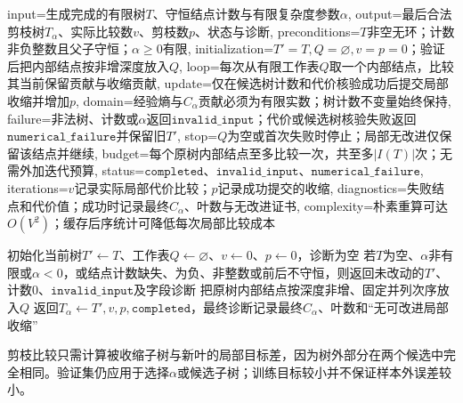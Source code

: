 \begin{AlgorithmContract}{
  input={生成完成的有限树$T$、守恒结点计数与有限复杂度参数$\alpha$},
  output={最后合法剪枝树$T_\alpha$、实际比较数$v$、剪枝数$p$、状态与诊断},
  preconditions={$T$非空无环；计数非负整数且父子守恒；$\alpha\ge0$有限},
  initialization={$T'=T,Q=\varnothing,v=p=0$；验证后把内部结点按非增深度放入$Q$},
  loop={每次从有限工作表$Q$取一个内部结点，比较其当前保留贡献与收缩贡献},
  update={仅在候选树计数和代价核验成功后提交局部收缩并增加$p$},
  domain={经验熵与$C_\alpha$贡献必须为有限实数；树计数不变量始终保持},
  failure={非法树、计数或$\alpha$返回$\mathtt{invalid\_input}$；代价或候选树核验失败返回$\mathtt{numerical\_failure}$并保留旧$T'$},
  stop={$Q$为空或首次失败时停止；局部无改进仅保留该结点并继续},
  budget={每个原树内部结点至多比较一次，共至多$|I(T)|$次；无需外加迭代预算},
  status={$\mathtt{completed}$、$\mathtt{invalid\_input}$、$\mathtt{numerical\_failure}$},
  iterations={$v$记录实际局部代价比较；$p$记录成功提交的收缩},
  diagnostics={失败结点和代价值；成功时记录最终$C_\alpha$、叶数与无改进证书},
  complexity={朴素重算可达$O(V^2)$；缓存后序统计可降低每次局部比较成本}
}
\begin{algorithm}[H]
\caption{给定$\alpha$的自底向上熵剪枝}\label{alg:V2-C04-entropy-prune}
初始化当前树$T'\leftarrow T$、工作表$Q\leftarrow\varnothing$、$v\leftarrow0$、$p\leftarrow0$，诊断为空\;
若$T$为空、$\alpha$非有限或$\alpha<0$，或结点计数缺失、为负、非整数或前后不守恒，则返回未改动的$T'$、计数$0$、$\mathtt{invalid\_input}$及字段诊断\;
把原树内部结点按深度非增、固定并列次序放入$Q$\;
返回$T_\alpha\leftarrow T',v,p,\mathtt{completed}$，最终诊断记录最终$C_\alpha$、叶数和“无可改进局部收缩”\;
\end{algorithm}
\end{AlgorithmContract}

剪枝比较只需计算被收缩子树与新叶的局部目标差，因为树外部分在两个候选中完全相同。验证集仍应用于选择$\alpha$或候选子树；训练目标较小并不保证样本外误差较小。


